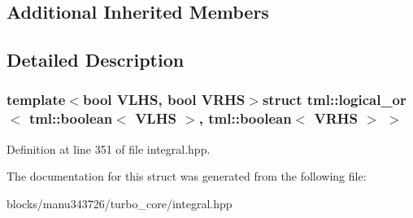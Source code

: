 \subsection*{Additional Inherited Members}


\subsection{Detailed Description}
\subsubsection*{template$<$bool V\+L\+H\+S, bool V\+R\+H\+S$>$struct tml\+::logical\+\_\+or$<$ tml\+::boolean$<$ V\+L\+H\+S $>$, tml\+::boolean$<$ V\+R\+H\+S $>$ $>$}



Definition at line 351 of file integral.\+hpp.



The documentation for this struct was generated from the following file\+:\begin{DoxyCompactItemize}
\item 
blocks/manu343726/turbo\+\_\+core/integral.\+hpp\end{DoxyCompactItemize}
